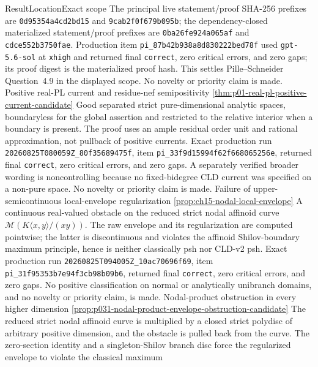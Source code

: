 \begin{AppLProvenanceLedger}{Result}{Location}{Exact scope}
{   The principal live statement/proof SHA-256 prefixes are
   \texttt{0d95354a4cd2bd15} and \texttt{9cab2f0f679b095b}; the
   dependency-closed materialized statement/proof prefixes are
   \texttt{0ba26fe924a065af} and \texttt{cdce552b3750fae}.
   Production item \nolinkurl{pi_87b42b938a8d830222bed78f} used
   \texttt{gpt-5.6-sol} at \texttt{xhigh} and returned final
   \texttt{correct}, zero critical errors, and zero gaps; its proof digest is
   the materialized proof hash.  This settles Pille--Schneider Question~4.9
   in the displayed scope.  No novelty or priority claim is made.}
\AppLProvenanceRecord
  {Positive real-PL current and residue-nef semipositivity}
  {\cref{thm:p01-real-pl-positive-current-candidate}}
  {Good separated strict pure-dimensional analytic spaces, boundaryless for
   the global assertion and restricted to the relative interior when a
   boundary is present.  The proof uses an ample residual order unit and
   rational approximation, not pullback of positive currents.  Exact
   production run \nolinkurl{20260825T080059Z_80f35689475f}, item
   \nolinkurl{pi_33f9d15994f62f668065256e}, returned final
   \texttt{correct}, zero critical errors, and zero gaps.  A separately
   verified broader wording is noncontrolling because no fixed-bidegree CLD
   current was specified on a non-pure space.  No novelty or priority claim
   is made.}
\AppLProvenanceRecord
  {Failure of upper-semicontinuous local-envelope regularization}
  {\cref{prop:ch15-nodal-local-envelope}}
  {A continuous real-valued obstacle on the reduced strict nodal affinoid
   curve \(\mathcal M(K\langle x,y\rangle/(xy))\).  The raw envelope and
   its regularization are computed pointwise; the latter is discontinuous
   and violates the affinoid Shilov-boundary maximum principle, hence is
   neither classically psh nor CLD-v2 psh.  Exact production run
   \nolinkurl{20260825T094005Z_10ac70696f69}, item
   \nolinkurl{pi_31f95353b7e94f3cb98b09b6}, returned final
   \texttt{correct}, zero critical errors, and zero gaps.  No positive
   classification on normal or analytically unibranch domains, and no
   novelty or priority claim, is made.}
\AppLProvenanceRecord
  {Nodal-product obstruction in every higher dimension}
  {\cref{prop:p031-nodal-product-envelope-obstruction-candidate}}
  {The reduced strict nodal affinoid curve is multiplied by a closed strict
   polydisc of arbitrary positive dimension, and the obstacle is pulled back
   from the curve.  The zero-section identity and a singleton-Shilov branch
   disc force the regularized envelope to violate the classical maximum
}
\end{AppLProvenanceLedger}
